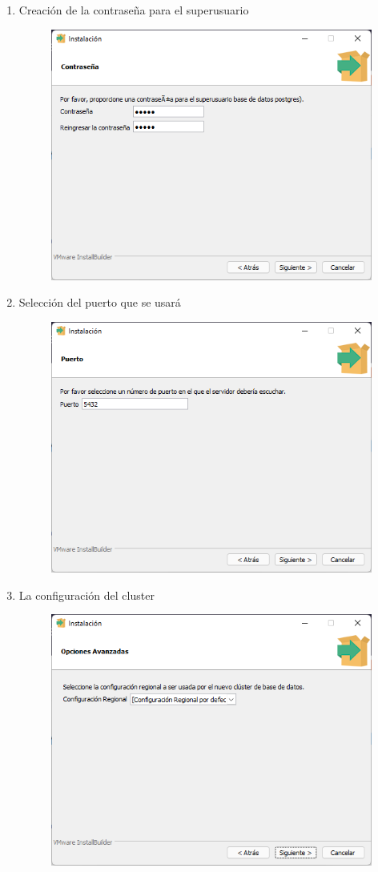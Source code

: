 \documentclass{exam}
\begin{document}
\begin{enumerate}
\begin{figure}[h]
        \end{figure}
        \item Creación de la contraseña para el superusuario
        \begin{figure}[h]
            \centering
            \includegraphics[width = 10 cm]{imgSalazar/I_07.png}
        \end{figure}
        \newpage
        \item Selección del puerto que se usará
        \begin{figure}[h]
            \centering
            \includegraphics[width = 10 cm]{imgSalazar/I_08.png}
        \end{figure}
        \item La configuración del cluster
        \begin{figure}[h]
            \centering
            \includegraphics[width = 10 cm]{imgSalazar/I_09.png}

\end{figure}
\end{enumerate}
\end{document}
